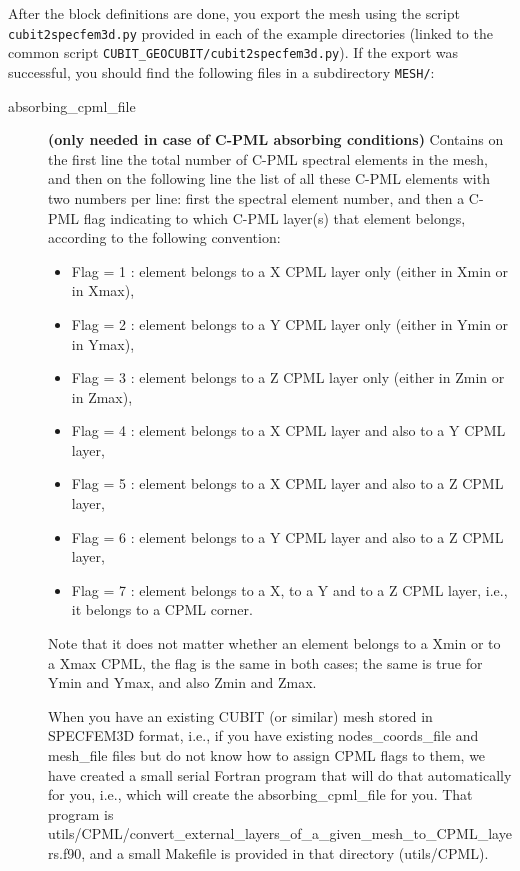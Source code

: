 After the block definitions are done, you export the mesh using the
script \texttt{cubit2specfem3d.py} provided in each of the example
directories (linked to the common script \texttt{CUBIT\_GEOCUBIT/cubit2specfem3d.py}).
If the export was successful, you should find the following
files in a subdirectory \texttt{MESH/}:
\begin{description}
\item [{absorbing\_cpml\_file}] \textbf{(only needed in case of C-PML absorbing
conditions)} Contains on the first line the total number of C-PML
spectral elements in the mesh, and then on the following line the
list of all these C-PML elements with two numbers per line: first
the spectral element number, and then a C-PML flag indicating to which
C-PML layer(s) that element belongs, according to the following convention:

\begin{itemize}
\item Flag = 1 : element belongs to a X CPML layer only (either in Xmin or in Xmax),
\item Flag = 2 : element belongs to a Y CPML layer only (either in Ymin or in Ymax),
\item Flag = 3 : element belongs to a Z CPML layer only (either in Zmin or in Zmax),
\item Flag = 4 : element belongs to a X CPML layer and also to a Y CPML layer,
\item Flag = 5 : element belongs to a X CPML layer and also to a Z CPML layer,
\item Flag = 6 : element belongs to a Y CPML layer and also to a Z CPML layer,
\item Flag = 7 : element belongs to a X, to a Y and to a Z CPML layer, i.e., it belongs to a CPML corner.
\end{itemize}

Note that it does not matter whether an element belongs to a Xmin
or to a Xmax CPML, the flag is the same in both cases; the same is
true for Ymin and Ymax, and also Zmin and Zmax.


When you have an existing CUBIT (or similar) mesh stored in SPECFEM3D
format, i.e., if you have existing \textquotedbl{}nodes\_coords\_file\textquotedbl{}
and \textquotedbl{}mesh\_file\textquotedbl{} files but do not know
how to assign CPML flags to them, we have created a small serial Fortran
program that will do that automatically for you, i.e., which will
create the \textquotedbl{}absorbing\_cpml\_file\textquotedbl{} for
you. That program is utils/CPML/convert\_external\_layers\_of\_a\_given\_mesh\_to\_CPML\_layers.f90,
and a small Makefile is provided in that directory (utils/CPML).



\end{description}
